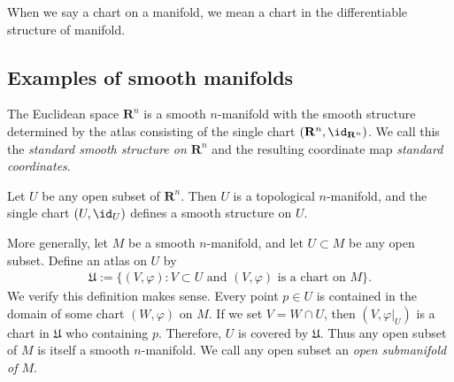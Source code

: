 \begin{notation}
    When we say a chart on a manifold, we mean a chart in the differentiable structure of manifold.
\end{notation}

\subsection{Examples of smooth manifolds}

\begin{example}
    The Euclidean space $\mathbf{R}^n$ is a smooth $n$-manifold with the smooth structure determined by the atlas consisting of the single chart $(\mathbf{R}^n, \id_{\mathbf{R}^n})$. We call this the \emph{standard smooth structure on $\mathbf{R}^n$} and the resulting coordinate map \emph{standard coordinates}.
\end{example}

\begin{comment}
\begin{example}[Finite-dimensional vector spaces]
    Let $V$ be a finite-dimensional vector space over $\mathbf{R}^n$. Any norm on $V$ determines a topology, which is independent of the choice of norm. With this topology, $V$ is a topological $n$-manifold, and has a natural smooth structure defined as follows. Every basis $(v_j)_{1 \leq j \leq n}$ for $V$ defines a basis isomorphism $v : \mathbf{R}^n \to V$ by
        \begin{align}
            v(x) := \sum_{j = 1}^{n}x_iv_i.
        \end{align}
    This map is a homeomorphism, so $(V, v^{-1})$ is a chart.
\end{example}
\end{comment}

\begin{example}\label{ex:open submanifolds}
    Let $U$ be any open subset of $\mathbf{R}^n$. Then $U$ is a topological $n$-manifold, and the single chart $(U, \id_U)$ defines a smooth structure on $U$.

    More generally, let $M$ be a smooth $n$-manifold, and let $U \subset M$ be any open subset. Define an atlas on $U$ by
    \begin{align*}
        \mathfrak{U} := \{(V, \varphi): V \subset U \text{ and } (V, \varphi) \text{ is a chart on }M\}.
    \end{align*}
    We verify this definition makes sense. Every point $p \in U$ is contained in the domain of some chart $(W, \varphi)$ on $M$. If we set $V = W \cap U$, then $(V, \varphi|_U)$ is a chart in $\mathfrak{U}$ who containing $p$. Therefore, $U$ is covered by $\mathfrak{U}$. Thus any open subset of $M$ is itself a smooth $n$-manifold. We call any open subset an \emph{open submanifold of $M$}.
\end{example}

